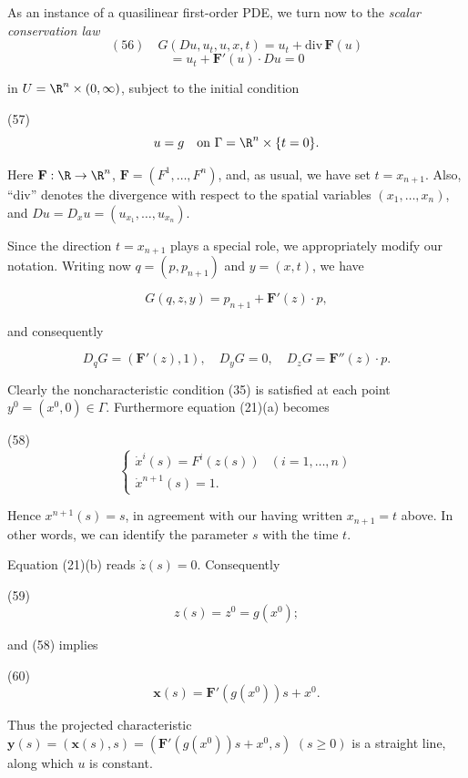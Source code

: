 \begin{example}
\label{ex:characteristics-conservation-laws}
As an instance of a quasilinear first-order PDE, we turn now to the \textit{scalar conservation law}
$$(56) \quad G(Du, u_t, u, x, t) = u_t + \text{div}\,\mathbf{F}(u)$$
$$= u_t + \mathbf{F}'(u) \cdot Du = 0$$

in $U = \R^n \times (0,\infty)$, subject to the initial condition

(57)
$$u = g \quad \text{on } \Gamma = \R^n \times \{t = 0\}.$$

Here $\mathbf{F}: \R \to \R^n$, $\mathbf{F} = (F^1,\ldots,F^n)$, and, as usual, we have set $t = x_{n+1}$. Also, ``div'' denotes the divergence with respect to the spatial variables $(x_1,\ldots,x_n)$, and $Du = D_x u = (u_{x_1},\ldots,u_{x_n})$.

Since the direction $t = x_{n+1}$ plays a special role, we appropriately modify our notation. Writing now $q = (p, p_{n+1})$ and $y = (x,t)$, we have

$$G(q, z, y) = p_{n+1} + \mathbf{F}'(z) \cdot p,$$

and consequently

$$D_q G = (\mathbf{F}'(z), 1), \quad D_y G = 0, \quad D_z G = \mathbf{F}''(z) \cdot p.$$

Clearly the noncharacteristic condition (35) is satisfied at each point $y^0 = (x^0, 0) \in \Gamma$. Furthermore equation (21)(a) becomes

(58)
$$\begin{cases}
\dot{x}^i(s) = F^i(z(s)) & (i = 1,\ldots,n) \\
\dot{x}^{n+1}(s) = 1.
\end{cases}$$

Hence $x^{n+1}(s) = s$, in agreement with our having written $x_{n+1} = t$ above. In other words, we can identify the parameter $s$ with the time $t$.

Equation (21)(b) reads $\dot{z}(s) = 0$. Consequently

(59)
$$z(s) = z^0 = g(x^0);$$

and (58) implies

(60)
$$\mathbf{x}(s) = \mathbf{F}'(g(x^0))s + x^0.$$

Thus the projected characteristic $\mathbf{y}(s) = (\mathbf{x}(s), s) = (\mathbf{F}'(g(x^0))s + x^0, s)$ $(s \geq 0)$ is a straight line, along which $u$ is constant.


\end{example}

